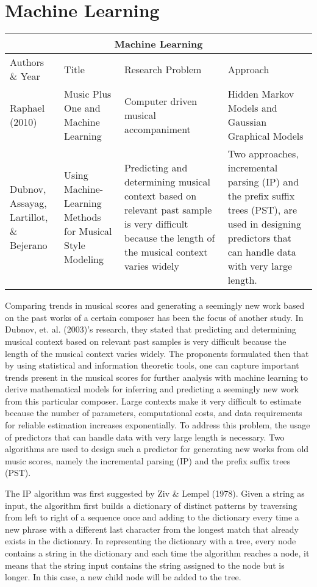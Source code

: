 \section{Machine Learning}

\begin{center}
\begin{tabular}{ |p{3cm}|p{3cm}|p{3cm}|p{3cm}| }
 \hline
 \multicolumn{4}{|c|}{Machine Learning} \\
 \hline
 Authors \& Year&Title&Research Problem&Approach\\
 \hline
 Raphael (2010)& Music Plus One and Machine Learning & Computer driven musical accompaniment &Hidden Markov Models and Gaussian Graphical Models\\
\hline
Dubnov, Assayag, Lartillot, \& Bejerano& Using Machine-Learning Methods for Musical Style Modeling& Predicting and determining musical context based on relevant past sample is very difficult because the length of the musical context varies widely & Two approaches, incremental parsing (IP) and the prefix suffix trees (PST), are used in designing predictors that can handle data with very large length.\\
\hline
\end{tabular}
\end{center}

Comparing trends in musical scores and generating a seemingly new work based on the past works of a certain composer has been the focus of another study. In Dubnov, et. al. (2003)’s research, they stated that predicting and determining musical context based on relevant past samples is very difficult because the length of the musical context varies widely. The proponents formulated then that by using statistical and information theoretic tools, one can capture important trends present in the musical scores for further analysis with machine learning to derive mathematical models for inferring and predicting a seemingly new work from this particular composer. Large contexts make it very difficult to estimate because the number of parameters, computational costs, and data requirements for reliable estimation increases exponentially. To address this problem, the usage of predictors that can handle data with very large length is necessary. Two algorithms are used to design such a predictor for generating new works from old music scores, namely the incremental parsing (IP) and the prefix suffix trees (PST).
 
The IP algorithm was first suggested by Ziv \& Lempel (1978). Given a string as input, the algorithm first builds a dictionary of distinct patterns by traversing from left to right of a sequence once and adding to the dictionary every time a new phrase with a different last character from the longest match that already exists in the dictionary. In representing the dictionary with a tree, every node contains a string in the dictionary and each time the algorithm reaches a node, it means that the string input contains the string assigned to the node but is longer. In this case, a new child node will be added to the tree.

